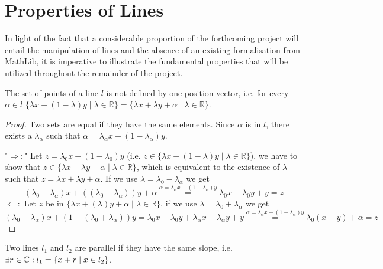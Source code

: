 \section{Properties of Lines}
In light of the fact that a considerable proportion of the forthcoming project will entail the manipulation of lines and the absence of an existing formalisation from MathLib, 
it is imperative to illustrate the fundamental properties that will be utilized throughout the remainder of the project.

\begin{lemma} 
    \label{lem:line_pionts_iff}
    \leanok
    The set of points of a line $l$ is not defined by one position vector, i.e. for every $\alpha\in l$  $\{\lambda x+(1-\lambda)y\mid\lambda\in\mathbb{R}\} = \{\lambda x+\lambda y+\alpha\mid\lambda\in\mathbb{R}\}$.
\end{lemma}
\begin{proof}
    \leanok
    Two sets are equal if they have the same elements. 
    Since $\alpha$ is in $l$, there exists a $\lambda_{\alpha}$ such that $\alpha = \lambda_{\alpha} x+(1-\lambda_{\alpha})y$.
    
    "$\Rightarrow:$" Let $z=\lambda_0 x + (1-\lambda_0)y$ (i.e.  $z\in\{\lambda x+(1-\lambda)y\mid\lambda\in\mathbb{R}\}$), we have to show that $z\in \{\lambda x+\lambda y+\alpha\mid\lambda\in\mathbb{R}\}$,
    which is equivalent to the existence of $\lambda$ such that $z = \lambda x+\lambda y+\alpha$. If we use $\lambda = \lambda_0 - \lambda_{\alpha} $ we get
    $$(\lambda_0 - \lambda_{\alpha}) x + ((\lambda_0 - \lambda_{\alpha}))y + \alpha  \overset{\alpha = \lambda_{\alpha} x+(1-\lambda_{\alpha})y}{=} \lambda_0 x - \lambda_0 y + y = z$$ %
    $\Leftarrow:$ Let $z$ be in $\{\lambda x+(\lambda)y+\alpha\mid\lambda\in\mathbb{R}\}$, if we use $\lambda = \lambda_0 + \lambda_{\alpha} $ we get
    $$(\lambda_0 + \lambda_{\alpha}) x + (1 -(\lambda_0 + \lambda_{\alpha}))y = \lambda_0 x - \lambda_0 y + \lambda_{\alpha} x - \lambda_{\alpha} y + y \overset{\alpha = \lambda_{\alpha} x+(1-\lambda_{\alpha})y}{=}  \lambda_0 (x - y) + \alpha = z$$
\end{proof}

\begin{definition}[parallel]
    \label{def:parallel}
    \leanok
    Two lines $l_1$ and $l_2$ are parallel if they have the same slope, i.e. $\exists r\in\mathbb{C}: l_1 = \{x + r \mid x\in l_2\}$.
\end{definition}

